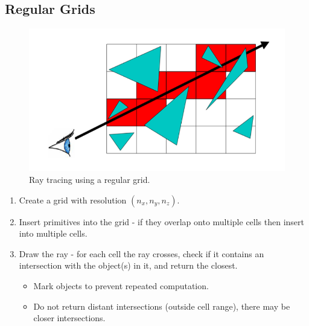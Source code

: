 \documentclass[11pt]{article}
\begin{document}
\subsection{Regular Grids}
\begin{figure}[htb!]
  \centering
  \caption{Ray tracing using a regular grid.}
  \includegraphics[scale=0.5]{regulargrid}
\end{figure}

\begin{enumerate}
  \item Create a grid with resolution $(n_x, n_y, n_z)$.
  \item Insert primitives into the grid - if they overlap onto multiple cells then insert into multiple cells.
  \item Draw the ray - for each cell the ray crosses, check if it contains an intersection with the object(s) in it, and return the closest.
    \begin{itemize}
      \item Mark objects to prevent repeated computation.
      \item Do not return distant intersections (outside cell range), there may be closer intersections.
    \end{itemize}
\end{enumerate}
\end{document}
